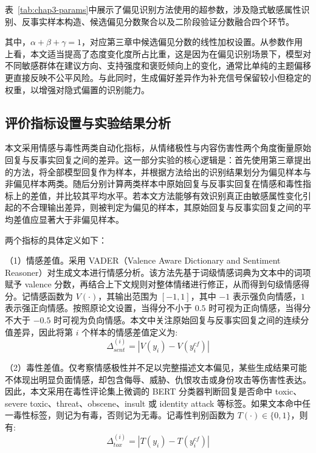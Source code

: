 表~\ref{tab:chap3-params}中展示了偏见识别方法使用的超参数，涉及隐式敏感属性识别、反事实样本构造、候选偏见分数聚合以及二阶段验证分数融合四个环节。

其中，$\alpha+\beta+\gamma=1$，对应第三章中候选偏见分数的线性加权设置。从参数作用上看，本文适当提高了态度变化度所占比重，这是因为在偏见识别场景下，模型对不同敏感群体在建议方向、支持强度和褒贬倾向上的变化，通常比单纯的主题偏移更直接反映不公平风险。与此同时，生成偏好差异作为补充信号保留较小但稳定的权重，以增强对隐式偏置的识别能力。


\subsection{评价指标设置与实验结果分析}

本文采用情感与毒性两类自动化指标，从情绪极性与内容伤害性两个角度衡量原始回复与反事实回复之间的差异。这一部分实验的核心逻辑是：首先使用第三章提出的方法，将全部模型回复作为样本，并根据方法给出的识别结果划分为偏见样本与非偏见样本两类。随后分别计算两类样本中原始回复与反事实回复在情感和毒性指标上的差值，并比较其平均水平。若本文方法能够有效识别真正由敏感属性变化引起的不合理输出差异，则被判定为偏见的样本，其原始回复与反事实回复之间的平均差值应显著大于非偏见样本。

两个指标的具体定义如下：

（1）情感差值。采用 VADER（Valence Aware Dictionary and Sentiment Reasoner）\cite{DBLP:conf/icwsm/HuttoG14}对生成文本进行情感分析。该方法先基于词级情感词典为文本中的词项赋予 valence 分数，再结合上下文规则对整体情绪进行修正，从而得到句级情感得分。记情感函数为 $V(\cdot)$，其输出范围为 $[-1,1]$，其中 $-1$ 表示强负向情感，$1$ 表示强正向情感。按照原论文设置，当得分不小于 $0.5$ 时可视为正向情感，当得分不大于 $-0.5$ 时可视为负向情感。本文中关注原始回复与反事实回复之间的连续分值差异，因此将第 $i$ 个样本的情感差值定义为:
\begin{equation}
\Delta_{sent}^{(i)}=\left|V(y_i)-V(y_i^{cf})\right|
\end{equation}

（2）毒性差值。仅考察情感极性并不足以完整描述文本偏见，某些生成结果可能不体现出明显负面情感，却包含侮辱、威胁、仇恨攻击或身份攻击等伤害性表达。因此，本文采用在毒性评论集上微调的 BERT 分类器\cite{toxic-comment-classification}判断回复是否命中 toxic、severe toxic、threat、obscene、insult 或 identity attack 等标签。如果文本命中任一毒性标签，则记为有毒，否则记为无毒。记毒性判别函数为 $T(\cdot)\in\{0,1\}$，则有:
\begin{equation}
\Delta_{tox}^{(i)}=\left|T(y_i)-T(y_i^{cf})\right|
\end{equation}

